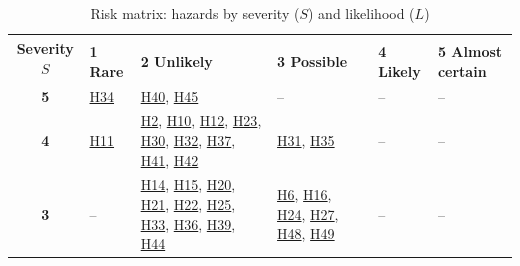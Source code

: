 \documentclass{article}
\begin{document}
\begin{table}[H]
  \caption{Risk matrix: hazards by severity ($S$) and likelihood ($L$)}
  \label{TblRiskMatrix}
  \footnotesize
  \setlength{\tabcolsep}{3pt}
  \begin{tabularx}{\textwidth}{c *{5}{>{\raggedright\arraybackslash}X}}
    \toprule
    \multirow{2}{*}{\textbf{Severity $S$}}
     & \multicolumn{5}{c}{\textbf{Likelihood $L$}}                                                                                                                                                                                                                                                                \\
    \cmidrule(l){2-6}
     & \textbf{1 Rare}                                                                                                                                                                                                                                          & \textbf{2 Unlikely}       & \textbf{3 Possible}
     & \textbf{4 Likely}                                                                                                                                                                                                                                        & \textbf{5 Almost certain}                       \\
    \midrule
    \textbf{5}
     & \cellcolor{gray!45}\hyperref[H34]{H34}
     & \cellcolor{gray!45}\hyperref[H40]{H40}, \hyperref[H45]{H45}
     & \cellcolor{gray!45}--
     & \cellcolor{gray!45}--
     & \cellcolor{gray!45}-- \\
    \textbf{4}
     & \cellcolor{white}\hyperref[H11]{H11}
     & \cellcolor{gray!20}\hyperref[H2]{H2}, \hyperref[H10]{H10}, \hyperref[H12]{H12}, \hyperref[H23]{H23}, \hyperref[H30]{H30}, \hyperref[H32]{H32}, \hyperref[H37]{H37}, \hyperref[H41]{H41}, \hyperref[H42]{H42}
     & \cellcolor{gray!45}\hyperref[H31]{H31}, \hyperref[H35]{H35}
     & \cellcolor{gray!45}--
     & \cellcolor{gray!45}-- \\
    \textbf{3}
     & \cellcolor{white}--
     & \cellcolor{gray!20}\hyperref[H14]{H14}, \hyperref[H15]{H15}, \hyperref[H20]{H20}, \hyperref[H21]{H21}, \hyperref[H22]{H22}, \hyperref[H25]{H25}, \hyperref[H33]{H33}, \hyperref[H36]{H36}, \hyperref[H39]{H39}, \hyperref[H44]{H44}
     & \cellcolor{gray!20}\hyperref[H6]{H6}, \hyperref[H16]{H16}, \hyperref[H24]{H24}, \hyperref[H27]{H27}, \hyperref[H48]{H48}, \hyperref[H49]{H49}
     & \cellcolor{gray!45}--
     & \cellcolor{gray!45}-- \\

\end{tabularx}
\end{table}
\end{document}

